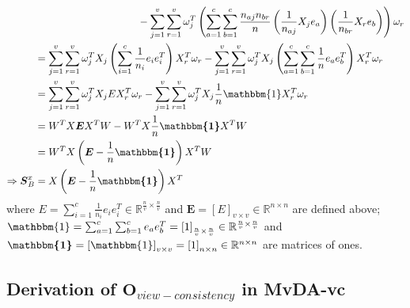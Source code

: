 \begin{appendix}
\begin{equation}
\begin{split}
            &\ \ \ \ \ \ \ \ \ \ \ \ \ \ \ \ \ \ \ \ \ \ \ \ \ \ \ \ \ \  - \sum_{j=1}^{v}\sum_{r=1}^{v}\omega_j^T\left(\sum_{a=1}^{c}\sum_{b=1}^{c}\frac{n_{aj}n_{br}}{n}\left(\frac{1}{n_{aj}}X_j e_a\right)\left(\frac{1}{n_{br}}X_r e_b\right)\right)\omega_r \\
            &= \sum_{j=1}^{v}\sum_{r=1}^{v}\omega_j^T X_j\left(\sum_{i=1}^{c}\frac{1}{n_i}e_i e_i^T\right)X_r^T\omega_r - \sum_{j=1}^{v}\sum_{r=1}^{v}\omega_j^T X_j\left(\sum_{a=1}^{c}\sum_{b=1}^{c}\frac{1}{n}e_a e_b^T\right)X_r^T\omega_r \\
            &= \sum_{j=1}^{v}\sum_{r=1}^{v} \omega_j^T X_j E X_r^T \omega_r - \sum_{j=1}^{v}\sum_{r=1}^{v} \omega_j^T X_j \frac{1}{n}\mathbbm{1} X_r^T \omega_r \\
            &= W^T X \boldsymbol{E} X^T W - W^T X \frac{1}{n}\boldsymbol{\mathbbm{1}} X^T W \\
            &= W^T X \left(\boldsymbol{E} - \frac{1}{n}\boldsymbol{\mathbbm{1}}\right) X^T W \\
            \Rightarrow \boldsymbol{S}^x_B &= X \left(\boldsymbol{E} - \frac{1}{n}\boldsymbol{\mathbbm{1}}\right) X^T
        \end{split}
        \label{eq:mvda_Sb_derivation}
    \end{equation}
    where $E = \sum_{i=1}^{c}\frac{1}{n_i}e_i e_i^T \in \mathbb{R}^{\frac{n}{v}\times \frac{n}{v}}$ and $\boldsymbol{E} = \left[E\right]_{v\times v} \in \mathbb{R}^{n\times n}$ are defined above; $\mathbbm{1} = \sum_{a=1}^{c}\sum_{b=1}^{c}e_a e_b^T = \left[1\right]_{\frac{n}{v} \times \frac{n}{v}} \in \mathbb{R}^{\frac{n}{v}\times \frac{n}{v}}$ and $\boldsymbol{\mathbbm{1}} = \left[\mathbbm{1}\right]_{v\times v} = \left[1\right]_{n \times n} \in \mathbb{R}^{n\times n}$ are matrices of ones.

\subsection{Derivation of \texorpdfstring{$\boldsymbol{O}_{view-consistency}$}{view-consistency term} in MvDA-vc} \label{subsec:derivation_mvdavc}


\end{appendix}
